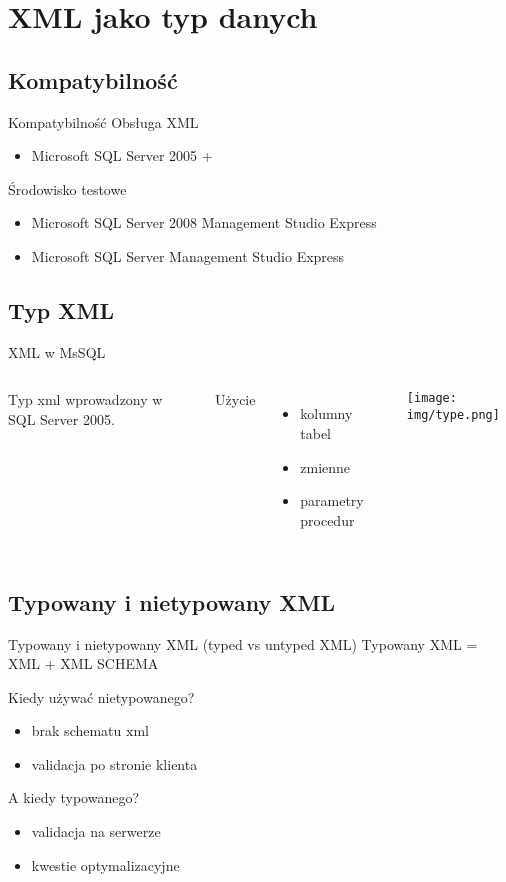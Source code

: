 \section{XML jako typ danych}

\subsection{Kompatybilność}
	\begin{frame}{Kompatybilność}
		Obsługa XML 
		\begin{itemize}
			\item Microsoft SQL Server 2005 +
		\end{itemize}
	
		Środowisko testowe 
		\begin{itemize} 
			\item Microsoft SQL Server 2008 Management Studio Express
		  	\item Microsoft SQL Server Management Studio Express
		\end{itemize}
	\end{frame}

\subsection{Typ XML}
	\begin{frame}{XML w MsSQL}		
		\begin{columns}[c]
		    	Typ xml wprowadzony w SQL Server 2005.
		    	
		    	Użycie
		    	\begin{itemize}
					\item kolumny tabel
				  	\item zmienne
				  	\item parametry procedur
				\end{itemize}
		    	\texttt{[image: img/type.png]}\\
								
	    \end{columns}
	\end{frame}

\subsection{Typowany i nietypowany XML}
	\begin{frame}{Typowany i nietypowany XML (typed vs untyped XML)}		
		Typowany XML = XML + XML SCHEMA
		
		Kiedy używać nietypowanego?
		\begin{itemize}
		  \item brak schematu xml
		  \item validacja po stronie klienta
		\end{itemize}
		
		A kiedy typowanego?
		\begin{itemize}
		  \item validacja na serwerze
		  \item kwestie optymalizacyjne
		\end{itemize}
	\end{frame}
	
